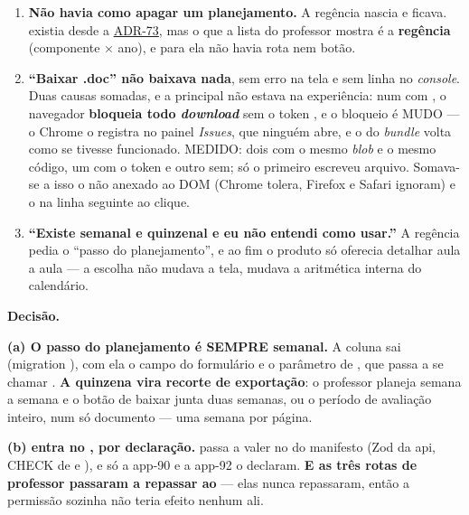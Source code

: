 \begin{enumerate}
  \item \textbf{Não havia como apagar um planejamento.} A regência nascia e
    ficava.  existia desde a
    \hyperref[adr:plano-de-ensino-bncc]{ADR-73}, mas o que a lista do professor mostra é a
    \textbf{regência} (componente $\times$ ano), e para ela não havia rota nem
    botão.
  \item \textbf{\enquote{Baixar .doc} não baixava nada}, sem erro na tela e sem
    linha no \emph{console}. Duas causas somadas, e a principal não estava na
    experiência: num  com , o navegador
    \textbf{bloqueia todo \emph{download}} sem o token , e
    o bloqueio é MUDO --- o Chrome o registra no painel \emph{Issues}, que
    ninguém abre, e o  do \emph{bundle} volta como se tivesse
    funcionado. MEDIDO: dois  com o mesmo \emph{blob} e o mesmo
    código, um com o token e outro sem; só o primeiro escreveu arquivo.
    Somava-se a isso o  não anexado ao DOM (Chrome tolera, Firefox e
    Safari ignoram) e o  na linha seguinte ao clique.
  \item \textbf{\enquote{Existe semanal e quinzenal e eu não entendi como
    usar.}} A regência pedia o \enquote{passo do planejamento}, e ao fim o
    produto só oferecia detalhar aula a aula --- a escolha não mudava a tela,
    mudava a aritmética interna do calendário.
\end{enumerate}

\textbf{Decisão.}

\textbf{(a) O passo do planejamento é SEMPRE semanal.} A coluna
 sai (migration
), com ela o campo do
formulário e o parâmetro de , que passa a se chamar
. \textbf{A quinzena vira recorte de exportação}: o
professor planeja semana a semana e o botão de baixar junta duas semanas, ou o
período de avaliação inteiro, num só documento --- uma semana por página.

\textbf{(b)  entra no , por declaração.}
 passa a valer no  do manifesto (Zod da api,
CHECK de  e ), e só a app-90 e a app-92
o declaram. \textbf{E as três rotas de professor passaram a repassar
 ao } --- elas nunca repassaram, então a permissão
sozinha não teria efeito nenhum ali.

